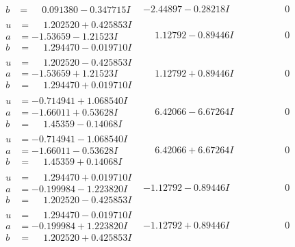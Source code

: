 \documentclass[1p]{elsarticle_modified}
\theoremstyle{definition}
\begin{document}
$$\begin{array}{c|c|c}
\begin{aligned}
b &= \phantom{-}0.091380 - 0.347715 I\end{aligned}
 & -2.44897 - 0.28218 I & \phantom{-0.000000 } 0 \\ \hline\begin{aligned}
u &= \phantom{-}1.202520 + 0.425853 I \\
a &= -1.53659 - 1.21523 I \\
b &= \phantom{-}1.294470 - 0.019710 I\end{aligned}
 & \phantom{-}1.12792 - 0.89446 I & \phantom{-0.000000 } 0 \\ \hline\begin{aligned}
u &= \phantom{-}1.202520 - 0.425853 I \\
a &= -1.53659 + 1.21523 I \\
b &= \phantom{-}1.294470 + 0.019710 I\end{aligned}
 & \phantom{-}1.12792 + 0.89446 I & \phantom{-0.000000 } 0 \\ \hline\begin{aligned}
u &= -0.714941 + 1.068540 I \\
a &= -1.66011 + 0.53628 I \\
b &= \phantom{-}1.45359 - 0.14068 I\end{aligned}
 & \phantom{-}6.42066 - 6.67264 I & \phantom{-0.000000 } 0 \\ \hline\begin{aligned}
u &= -0.714941 - 1.068540 I \\
a &= -1.66011 - 0.53628 I \\
b &= \phantom{-}1.45359 + 0.14068 I\end{aligned}
 & \phantom{-}6.42066 + 6.67264 I & \phantom{-0.000000 } 0 \\ \hline\begin{aligned}
u &= \phantom{-}1.294470 + 0.019710 I \\
a &= -0.199984 - 1.223820 I \\
b &= \phantom{-}1.202520 - 0.425853 I\end{aligned}
 & -1.12792 - 0.89446 I & \phantom{-0.000000 } 0 \\ \hline\begin{aligned}
u &= \phantom{-}1.294470 - 0.019710 I \\
a &= -0.199984 + 1.223820 I \\
b &= \phantom{-}1.202520 + 0.425853 I\end{aligned}
 & -1.12792 + 0.89446 I & \phantom{-0.000000 } 0 \\ \hline\begin{aligned}

\end{aligned}
\end{array}$$
\end{document}
